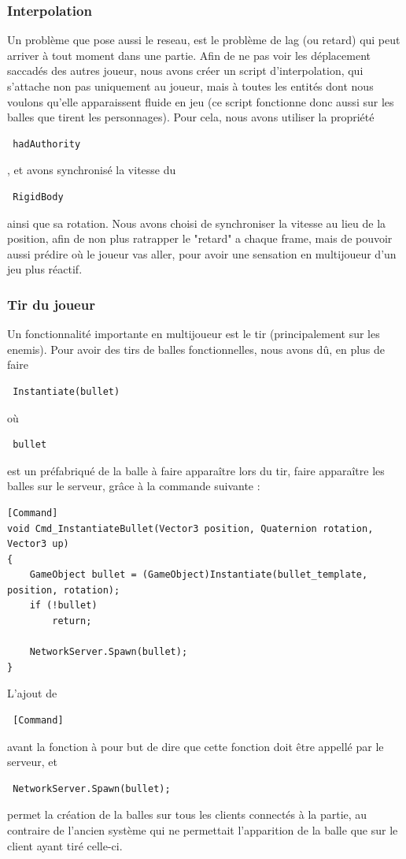 ﻿\documentclass[12pt]{article}
\begin{document}
\subsubsection {Interpolation}
Un problème que pose aussi le reseau, est le problème de lag (ou retard) qui peut arriver à tout moment dans une partie.
Afin de ne pas voir les déplacement saccadés des autres joueur, nous avons créer un script d'interpolation, qui s'attache
non pas uniquement au joueur, mais à toutes les entités dont nous voulons qu'elle apparaissent fluide en jeu (ce script fonctionne
donc aussi sur les balles que tirent les personnages).
Pour cela, nous avons utiliser la propriété \begin{verbatim} hadAuthority\end{verbatim}, et avons synchronisé la vitesse du
\begin{verbatim} RigidBody \end{verbatim} ainsi que sa rotation. Nous avons choisi de synchroniser la vitesse au lieu de la
position, afin de non plus ratrapper le "retard" a chaque frame, mais de pouvoir aussi prédire où le joueur vas aller,
pour avoir une sensation en multijoueur d'un jeu plus réactif.

\subsubsection {Tir du joueur}
Un fonctionnalité importante en multijoueur est le tir (principalement sur les enemis).
Pour avoir des tirs de balles fonctionnelles, nous avons dû, en plus de faire
\begin{verbatim} Instantiate(bullet) \end{verbatim} où \begin{verbatim} bullet \end{verbatim}
est un préfabriqué de la balle à faire apparaître lors du tir, faire apparaître les balles
sur le serveur, grâce à la commande suivante :
\begin{verbatim}
[Command]
void Cmd_InstantiateBullet(Vector3 position, Quaternion rotation, Vector3 up)
{
    GameObject bullet = (GameObject)Instantiate(bullet_template, position, rotation);
    if (!bullet)
        return;

    NetworkServer.Spawn(bullet);
}
\end{verbatim}
L'ajout de \begin{verbatim} [Command] \end{verbatim} avant la fonction à pour but de dire que cette fonction doit être appellé
par le serveur, et \begin{verbatim} NetworkServer.Spawn(bullet); \end{verbatim} permet la création de la balles sur tous
les clients connectés à la partie, au contraire de l'ancien système qui ne permettait l'apparition de la balle que sur le client
ayant tiré celle-ci.
\end{document}
